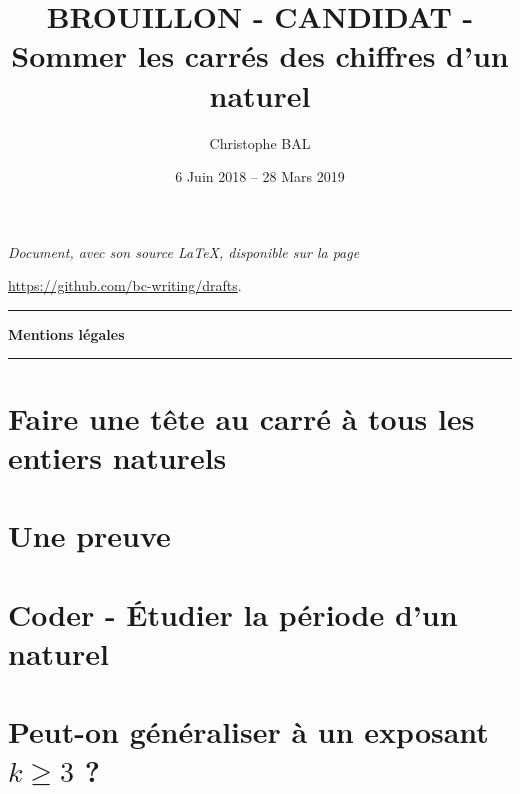 \documentclass[12pt]{amsart}
\begin{document}
\title{BROUILLON - CANDIDAT - Sommer les carrés des chiffres d'un naturel}
\author{Christophe BAL}
\date{6 Juin 2018 -- 28 Mars 2019}

\maketitle

\begin{center}
	\itshape
	Document, avec son source \LaTeX, disponible sur la page
	
	\url{https://github.com/bc-writing/drafts}.
\end{center}


\bigskip


\begin{center}
	\hrule\vspace{.3em}
	{
		\fontsize{1.35em}{1em}\selectfont
		\textbf{Mentions \og légales \fg}
	}
			
	\vspace{0.45em}
	\doclicenseThis
	\hrule
\end{center}


\setcounter{tocdepth}{1}
\tableofcontents



\section{Faire une tête au carré à tous les entiers naturels}

\label{conjecture}


\section{Une preuve}\label{proof}




\section{Coder - Étudier la \og période \fg{} d'un naturel}




\section{\texorpdfstring{Peut-on généraliser à un exposant $k \geqslant 3$ ?}%
		                {Peut-on généraliser à un exposant k >= 3 ?}}





%
%
\end{document}
